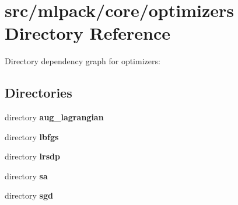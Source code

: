 \section{src/mlpack/core/optimizers Directory Reference}
\label{dir_becda7b54266400a4fb5aab8b420973e}
Directory dependency graph for optimizers\-:
\subsection*{Directories}
\begin{DoxyCompactItemize}
\item 
directory {\bf aug\-\_\-lagrangian}
\item 
directory {\bf lbfgs}
\item 
directory {\bf lrsdp}
\item 
directory {\bf sa}
\item 
directory {\bf sgd}
\end{DoxyCompactItemize}
